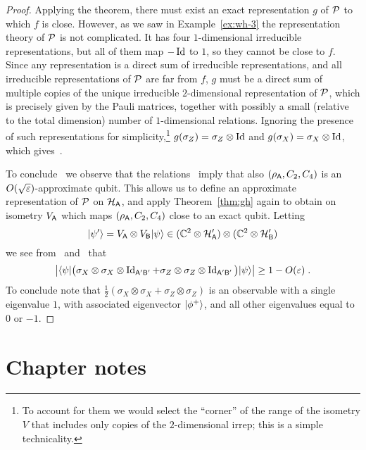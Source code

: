\begin{proof}
Applying the theorem, there must exist an exact representation $g$ of $\mathcal{P}$ to which $f$ is close. However, as we saw in Example~\ref{ex:wh-3} the representation theory of $\mathcal{P}$ is not complicated. It has four $1$-dimensional irreducible representations, but all of them map $-\mathop{\rm Id}\nolimits$ to $1$, so they cannot be close to $f$. Since any representation is a direct sum of irreducible representations, and all irreducible representations of $\mathcal{P}$ are far from $f$, $g$ must be a direct sum of multiple copies of the unique irreducible $2$-dimensional representation of $\mathcal{P}$, which is precisely given by the Pauli matrices, together with possibly a small (relative to the total dimension) number of $1$-dimensional relations. Ignoring the presence of such representations for simplicity,\footnote{To account for them we would select the ``corner'' of the range of the isometry $V$ that includes only copies of the $2$-dimensional irrep; this is a simple technicality.} $g(\sigma_Z) = \sigma_Z \otimes \mathop{\rm Id}\nolimits$ and $g(\sigma_X) = \sigma_X \otimes \mathop{\rm Id}\nolimits$, which gives~. 

To conclude~ we observe that the relations~ imply that also $(\rho_{\textsf{A}},C_2,C_4)$ is an $O(\sqrt{\varepsilon})$-approximate qubit. This allows us to define an approximate representation of $\mathcal{P}$ on $\mathcal{H}_{\textsf{A}}$, and apply Theorem~\ref{thm:gh} again to obtain on isometry $V_{\textsf{A}}$ which maps $(\rho_{\textsf{A}},C_2,C_4)$ close to an exact qubit. Letting 
\[ |\psi'\rangle = V_{\textsf{A}} \otimes V_{\textsf{B}} |\psi\rangle \in (\mathbb{C}^2 \otimes \mathcal{H}_{\textsf{A}}')\otimes (\mathbb{C}^2 \otimes \mathcal{H}_{\textsf{B}}') \]
we see from~ and~ that 
\[\big| \langle\psi| \big(\sigma_X \otimes \sigma_X \otimes \mathop{\rm Id}\nolimits_{{\textsf{A}}'{\textsf{B}}'} + \sigma_Z \otimes \sigma_Z \otimes \mathop{\rm Id}\nolimits_{{\textsf{A}}'{\textsf{B}}'} \big) |\psi\rangle\big| \geq 1-O({\varepsilon})\;.\]
To conclude note that $\frac{1}{2}(\sigma_X \otimes \sigma_X + \sigma_Z \otimes \sigma_Z )$ is an observable with a single eigenvalue $1$, with associated eigenvector $|\phi^+\rangle$, and all other eigenvalues equal to $0$ or $-1$. 
\end{proof}


\section{Chapter notes}
\label{section-rigidity-notes}










